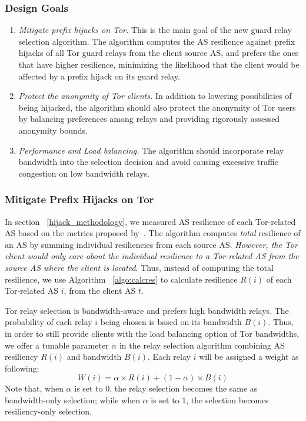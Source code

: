 \subsubsection{Design Goals}
\begin{enumerate}
\item \emph{Mitigate prefix hijacks on Tor.} This is the main goal of the new guard relay selection algorithm. The algorithm computes the AS resilience against prefix hijacks of all Tor guard relays from the client source AS, and prefers the ones that have higher resilience, minimizing the likelihood that the client would be affected by a prefix hijack on its guard relay. 
\item \emph{Protect the anonymity of Tor clients.} In addition to lowering possibilities of being hijacked, the algorithm should also protect the anonymity of Tor users by balancing preferences among relays and providing rigorously assessed anonymity bounds. 
\item \emph{Performance and Load balancing.} The algorithm should incorporate relay bandwidth into the selection decision and avoid causing excessive traffic congestion on low bandwidth relays.
\end{enumerate}

\subsubsection{Mitigate Prefix Hijacks on Tor}

In section ~\ref{hijack_methodology}, we measured AS resilience of each Tor-related AS based on the metrics proposed by~\cite{lad2007understanding}. The algorithm computes \emph{total} resilience of an AS by summing individual resiliencies from each source AS. \emph{However, the Tor client would only care about the individual resilience to a Tor-related AS from the source AS where the client is located}. Thus, instead of computing the total resilience, we use Algorithm ~\ref{algo:calcres} to calculate resilience $R(i)$ of each Tor-related AS $i$, from the client AS $t$. 

Tor relay selection is bandwidth-aware and prefers high bandwidth relays. The probability of each relay $i$ being chosen is based on its bandwidth $B(i)$. Thus, in order to still provide clients with the load balancing option of Tor bandwidths, we offer a tunable parameter $\alpha$ in the relay selection algorithm combining AS resiliency $R(i)$ and bandwidth $B(i)$. Each relay $i$ will be assigned a weight as following:
\begin{equation*}
W(i) = \alpha \times R(i) + (1 - \alpha) \times B(i)
\end{equation*}
Note that, when $\alpha$ is set to $0$, the relay selection becomes the same as bandwidth-only selection; while when $\alpha$ is set to $1$, the selection becomes resiliency-only selection. 

